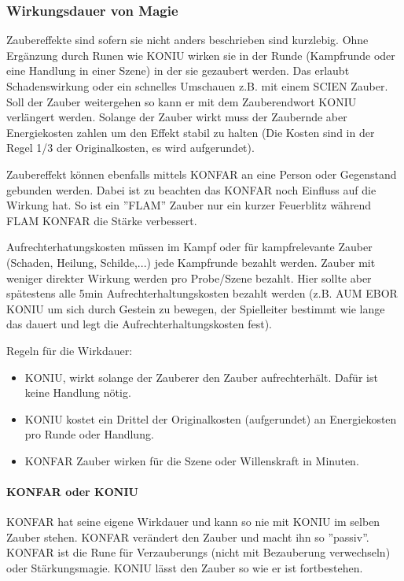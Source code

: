 \documentclass{article}
\begin{document}
\subsubsection{Wirkungsdauer von Magie}

Zaubereffekte sind sofern sie nicht anders beschrieben sind kurzlebig. Ohne Ergänzung durch Runen wie KONIU
wirken sie in der Runde (Kampfrunde oder eine Handlung in einer Szene) in der sie gezaubert werden. Das erlaubt
Schadenswirkung oder ein schnelles Umschauen z.B. mit einem SCIEN Zauber. Soll der Zauber weitergehen so kann er
mit dem Zauberendwort KONIU verlängert werden. Solange der Zauber wirkt muss der Zaubernde aber Energiekosten zahlen
um den Effekt stabil zu halten (Die Kosten sind in der Regel 1/3 der Originalkosten, es wird aufgerundet).

Zaubereffekt können ebenfalls mittels KONFAR an eine Person oder Gegenstand gebunden werden. Dabei ist zu beachten
das KONFAR noch Einfluss auf die Wirkung hat. So ist ein ''FLAM'' Zauber nur ein kurzer Feuerblitz während FLAM KONFAR
die Stärke verbessert.

Aufrechterhatungskosten müssen im Kampf oder für kampfrelevante Zauber (Schaden, Heilung, Schilde,...) jede Kampfrunde
bezahlt werden. Zauber mit weniger direkter Wirkung werden pro Probe/Szene bezahlt. Hier sollte aber spätestens alle
5min Aufrechterhaltungskosten bezahlt werden (z.B. AUM EBOR KONIU um sich durch Gestein zu bewegen, der Spielleiter
bestimmt wie lange das dauert und legt die Aufrechterhaltungskosten fest).

Regeln für die Wirkdauer:

\begin{itemize}
\item KONIU, wirkt solange der Zauberer den Zauber aufrechterhält. Dafür ist keine Handlung nötig.
\item KONIU kostet ein Drittel der Originalkosten (aufgerundet) an Energiekosten pro Runde oder Handlung.
\item KONFAR Zauber wirken für die Szene oder Willenskraft in Minuten.
\end{itemize}

\paragraph{KONFAR oder KONIU}

KONFAR hat seine eigene Wirkdauer und kann so nie mit KONIU im selben Zauber stehen. KONFAR verändert den Zauber und
macht ihn so ''passiv''. KONFAR ist die Rune für Verzauberungs (nicht mit Bezauberung verwechseln) oder Stärkungsmagie.
KONIU lässt den Zauber so wie er ist fortbestehen.
\end{document}
